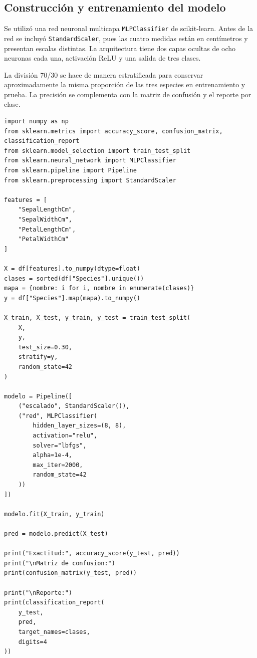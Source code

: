 \documentclass[14pt,twoside]{article}
\begin{document}
\subsection{Construcción y entrenamiento del modelo}

Se utilizó una red neuronal multicapa \texttt{MLPClassifier} de scikit-learn. Antes de la red se incluyó \texttt{StandardScaler}, pues las cuatro medidas están en centímetros y presentan escalas distintas. La arquitectura tiene dos capas ocultas de ocho neuronas cada una, activación ReLU y una salida de tres clases.

La división 70/30 se hace de manera estratificada para conservar aproximadamente la misma proporción de las tres especies en entrenamiento y prueba. La precisión se complementa con la matriz de confusión y el reporte por clase.

\begin{lstlisting}[style=pgpython,caption={Preprocesamiento, entrenamiento y evaluación del clasificador neuronal.}]
import numpy as np
from sklearn.metrics import accuracy_score, confusion_matrix, classification_report
from sklearn.model_selection import train_test_split
from sklearn.neural_network import MLPClassifier
from sklearn.pipeline import Pipeline
from sklearn.preprocessing import StandardScaler

features = [
    "SepalLengthCm",
    "SepalWidthCm",
    "PetalLengthCm",
    "PetalWidthCm"
]

X = df[features].to_numpy(dtype=float)
clases = sorted(df["Species"].unique())
mapa = {nombre: i for i, nombre in enumerate(clases)}
y = df["Species"].map(mapa).to_numpy()

X_train, X_test, y_train, y_test = train_test_split(
    X,
    y,
    test_size=0.30,
    stratify=y,
    random_state=42
)

modelo = Pipeline([
    ("escalado", StandardScaler()),
    ("red", MLPClassifier(
        hidden_layer_sizes=(8, 8),
        activation="relu",
        solver="lbfgs",
        alpha=1e-4,
        max_iter=2000,
        random_state=42
    ))
])

modelo.fit(X_train, y_train)

pred = modelo.predict(X_test)

print("Exactitud:", accuracy_score(y_test, pred))
print("\nMatriz de confusion:")
print(confusion_matrix(y_test, pred))

print("\nReporte:")
print(classification_report(
    y_test,
    pred,
    target_names=clases,
    digits=4
))
\end{lstlisting}
\end{document}
